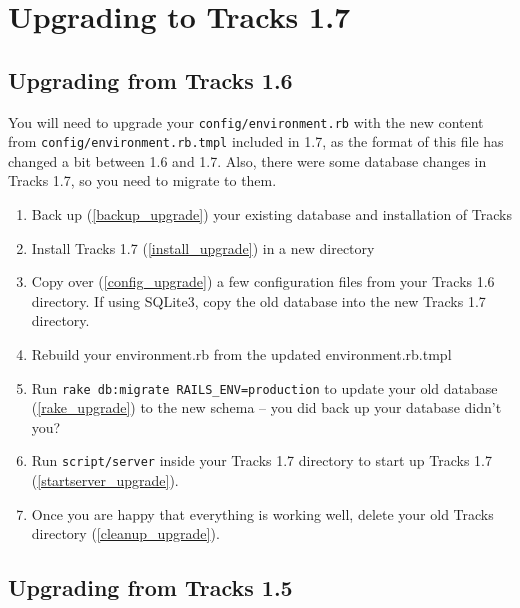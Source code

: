 \documentclass[10pt,twoside]{memoir}
\begin{document}
\chapter{Upgrading to Tracks 1.7}
\label{upgrading}

\section{Upgrading from Tracks 1.6}
\label{upgrading_1.6}

You will need to upgrade your \texttt{config/environment.rb} with the new content from \texttt{config/environment.rb.tmpl} included in 1.7, as the format of this file has changed a bit between 1.6 and 1.7. Also, there were some database changes in Tracks 1.7, so you need to migrate to them.


\begin{enumerate}


\item Back up (\autoref{backup_upgrade}) your existing database and installation of Tracks

\item Install Tracks 1.7 (\autoref{install_upgrade}) in a new directory

\item Copy over (\autoref{config_upgrade}) a few configuration files from your Tracks 1.6 directory. If using SQLite3, copy the old database into the new Tracks 1.7 directory.

\item Rebuild your environment.rb from the updated environment.rb.tmpl

\item Run \texttt{rake db:migrate RAILS\_ENV=production} to update your old database (\autoref{rake_upgrade}) to the new schema -- you did back up your database didn't you?

\item Run \texttt{script/server} inside your Tracks 1.7 directory to start up Tracks 1.7 (\autoref{startserver_upgrade}).

\item Once you are happy that everything is working well, delete your old Tracks directory (\autoref{cleanup_upgrade}).
\end{enumerate}

\section{Upgrading from Tracks 1.5}
\label{upgrading_1.5}
\end{document}
